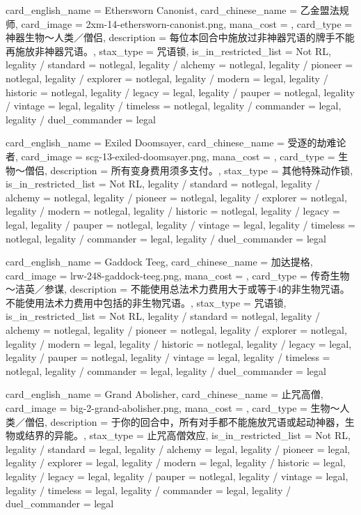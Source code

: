 \documentclass[lang = cn, color = black, 10pt]{AllThatStax}
\begin{document}
\card
{
	card_english_name = {Ethersworn Canonist},
	card_chinese_name = {乙金盟法规师},
	card_image = 2xm-14-ethersworn-canonist.png,
	mana_cost = ,
	card_type = 神器生物～人类／僧侣,
	description = {每位本回合中施放过非神器咒语的牌手不能再施放非神器咒语。},
	stax_type = 咒语锁,
	is_in_restricted_list = Not RL,
	legality / standard = notlegal,
	legality / alchemy = notlegal,
	legality / pioneer = notlegal,
	legality / explorer = notlegal,
	legality / modern = legal,
	legality / historic = notlegal,
	legality / legacy = legal,
	legality / pauper = notlegal,
	legality / vintage = legal,
	legality / timeless = notlegal,
	legality / commander = legal,
	legality / duel_commander = legal
}

\card
{
	card_english_name = {Exiled Doomsayer},
	card_chinese_name = {受逐的劫难论者},
	card_image = scg-13-exiled-doomsayer.png,
	mana_cost = ,
	card_type = 生物～僧侣,
	description = {所有变身费用须多支付。},
	stax_type = 其他特殊动作锁,
	is_in_restricted_list = Not RL,
	legality / standard = notlegal,
	legality / alchemy = notlegal,
	legality / pioneer = notlegal,
	legality / explorer = notlegal,
	legality / modern = notlegal,
	legality / historic = notlegal,
	legality / legacy = legal,
	legality / pauper = notlegal,
	legality / vintage = legal,
	legality / timeless = notlegal,
	legality / commander = legal,
	legality / duel_commander = legal
}

\card
{
	card_english_name = {Gaddock Teeg},
	card_chinese_name = {加达提格},
	card_image = lrw-248-gaddock-teeg.png,
	mana_cost = ,
	card_type = 传奇生物～洁英／参谋,
	description = {不能使用总法术力费用大于或等于4的非生物咒语。\\
不能使用法术力费用中包括的非生物咒语。},
	stax_type = 咒语锁,
	is_in_restricted_list = Not RL,
	legality / standard = notlegal,
	legality / alchemy = notlegal,
	legality / pioneer = notlegal,
	legality / explorer = notlegal,
	legality / modern = legal,
	legality / historic = notlegal,
	legality / legacy = legal,
	legality / pauper = notlegal,
	legality / vintage = legal,
	legality / timeless = notlegal,
	legality / commander = legal,
	legality / duel_commander = legal
}

\card
{
	card_english_name = {Grand Abolisher},
	card_chinese_name = {止咒高僧},
	card_image = big-2-grand-abolisher.png,
	mana_cost = ,
	card_type = 生物～人类／僧侣,
	description = {于你的回合中，所有对手都不能施放咒语或起动神器，生物或结界的异能。},
	stax_type = 止咒高僧效应,
	is_in_restricted_list = Not RL,
	legality / standard = legal,
	legality / alchemy = legal,
	legality / pioneer = legal,
	legality / explorer = legal,
	legality / modern = legal,
	legality / historic = legal,
	legality / legacy = legal,
	legality / pauper = notlegal,
	legality / vintage = legal,
	legality / timeless = legal,
	legality / commander = legal,
	legality / duel_commander = legal
}
\end{document}

